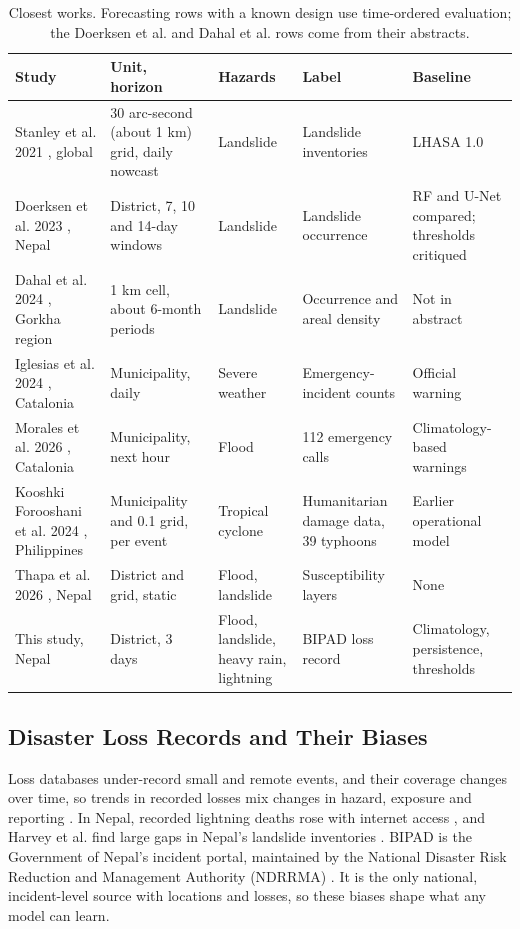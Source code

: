\documentclass[conference]{IEEEtran}
\begin{document}
\begin{table}[t]
\caption{Closest works. Forecasting rows with a known design use time-ordered evaluation; the Doerksen et al. and Dahal et al. rows come from their abstracts.}
\label{tab:closest}
\centering
\scriptsize
\setlength{\tabcolsep}{3pt}
\begin{tabular}{R{1.65cm}R{1.65cm}R{1.4cm}R{1.55cm}R{1.45cm}}
\toprule
Study & Unit, horizon & Hazards & Label & Baseline \\
\midrule
Stanley et al. 2021 \cite{Stanley2021}, global & 30 arc-second (about 1 km) grid, daily nowcast & Landslide & Landslide inventories & LHASA 1.0 \\
Doerksen et al. 2023 \cite{Doerksen2023}, Nepal & District, 7, 10 and 14-day windows & Landslide & Landslide occurrence & RF and U-Net compared; thresholds critiqued \\
Dahal et al. 2024 \cite{DahalA2024}, Gorkha region & 1 km cell, about 6-month periods & Landslide & Occurrence and areal density & Not in abstract \\
Iglesias et al. 2024 \cite{Iglesias2024}, Catalonia & Municipality, daily & Severe weather & Emergency-incident counts & Official warning \\
Morales et al. 2026 \cite{Morales2026}, Catalonia & Municipality, next hour & Flood & 112 emergency calls & Climatology-based warnings \\
Kooshki Forooshani et al. 2024 \cite{KooshkiForooshani2024}, Philippines & Municipality and 0.1\textdegree{} grid, per event & Tropical cyclone & Humanitarian damage data, 39 typhoons & Earlier operational model \\
Thapa et al. 2026 \cite{Thapa2026}, Nepal & District and grid, static & Flood, landslide & Susceptibility layers & None \\
This study, Nepal & District, 3 days & Flood, landslide, heavy rain, lightning & BIPAD loss record & Climatology, persistence, thresholds \\
\bottomrule
\end{tabular}
\end{table}

\subsection{Disaster Loss Records and Their Biases}
Loss databases under-record small and remote events, and their coverage changes over time, so trends in recorded losses mix changes in hazard, exposure and reporting \cite{Gall2009,Jones2022}. In Nepal, recorded lightning deaths rose with internet access \cite{Adhikari2021}, and Harvey et al. find large gaps in Nepal's landslide inventories \cite{Harvey2024}. BIPAD is the Government of Nepal's incident portal, maintained by the National Disaster Risk Reduction and Management Authority (NDRRMA) \cite{BIPAD2026,Gyawali2022}. It is the only national, incident-level source with locations and losses, so these biases shape what any model can learn.
\end{document}
